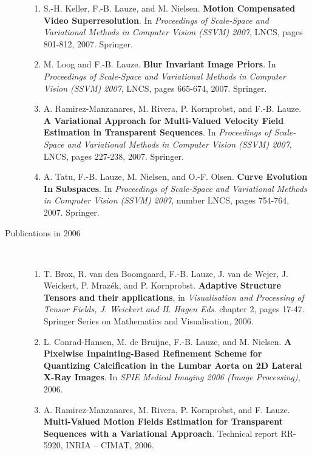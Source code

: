\documentclass[10pt]{article}
\begin{document}
\begin{description}
\begin{enumerate}
  \item S.-H. Keller, F.-B. Lauze, and M. Nielsen.  \textbf{Motion Compensated Video
      Superresolution}.  In \textit{Proceedings of Scale-Space and Variational Methods in
      Computer Vision (SSVM) 2007}, LNCS, pages 801-812, 2007.  Springer.

  \item M. Loog and F.-B. Lauze.  \textbf{Blur Invariant Image Priors}.  In
    \textit{Proceedings of Scale-Space and Variational Methods in Computer Vision (SSVM)
      2007}, LNCS, pages 665-674, 2007.  Springer.

  \item A. Ramirez-Manzanares, M. Rivera, P. Kornprobst, and F.-B. Lauze.  \textbf{A
      Variational Approach for Multi-Valued Velocity Field Estimation in Transparent
      Sequences}.  In \textit{Proceedings of Scale-Space and Variational Methods in
      Computer Vision (SSVM) 2007}, LNCS, pages 227-238, 2007.  Springer.

  \item A. Tatu, F.-B. Lauze, M. Nielsen, and O.-F. Olsen.  \textbf{Curve Evolution In
      Subspaces}.  In \textit{Proceedings of Scale-Space and Variational Methods in
      Computer Vision (SSVM) 2007}, number LNCS, pages 754-764, 2007.  Springer.

  \end{enumerate}

\item[Publications in 2006]~\\
  \begin{enumerate} 

  \item T. Brox, R. van den Boomgaard, F.-B. Lauze, J. van de Wejer, J. Weickert,
    P. Mraz{\'e}k, and P. Kornprobst.  \textbf{Adaptive Structure Tensors and their
      applications}, in \textit{Visualisation and Processing of Tensor Fields, J. Weickert
      and H. Hagen Eds.} chapter 2, pages 17-47.  Springer Series on Mathematics and
    Visualisation, 2006.

  \item L. Conrad-Hansen, M. de Bruijne, F.-B. Lauze, and M. Nielsen.  \textbf{A Pixelwise
      Inpainting-Based Refinement Scheme for Quantizing Calcification in the Lumbar Aorta
      on 2D Lateral X-Ray Images}.  In \textit{SPIE Medical Imaging 2006 (Image
      Processing)}, 2006.

  \item A. Ramirez-Manzanares, M. Rivera, P. Kornprobst, and F. Lauze.
    \textbf{Multi-Valued Motion Fields Estimation for Transparent Sequences with a
      Variational Approach}.  Technical report RR-5920, INRIA -- CIMAT, 2006.


\end{enumerate}
\end{description}
\end{document}
